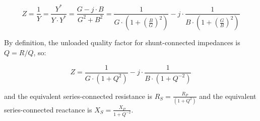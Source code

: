 \begin{equation}
Z = \frac{1}{Y} = \frac{Y^*}{Y \cdot Y^*} = \frac{G - j \cdot B}{G^2 + B^2} = \frac{1}{G \cdot \left( 1 + \left( \frac{B}{G} \right)^2\right)} - j \cdot \frac{1}{B \cdot \left( 1 + \left( \frac{G}{B} \right)^2\right)} 
\end{equation}

\noindent By definition, the unloaded quality factor for shunt-connected impedances is $Q = R/Q$, so:

\begin{equation}
Z = \frac{1}{G \cdot (1 + Q^2)} - j \cdot \frac{1}{B \cdot (1 + Q^{-2})}
\end{equation}

\noindent and the equivalent series-connected resistance is $R_S = \frac{R_P}{(1 + Q^2)}$ and the equivalent series-connected reactance is $X_S = \frac{X_P} {1 + Q^{-2}}$.


